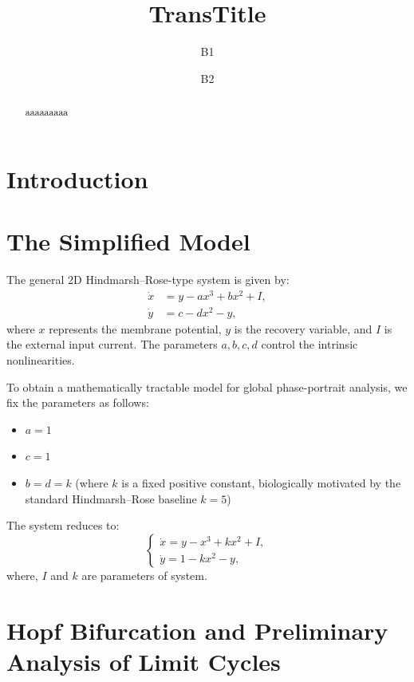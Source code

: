 \documentclass[11pt,reqno]{amsart}
\title[T]{TransTitle}
\author[A1]{B1}
\author[A2]{B2}
\theoremstyle{plain}
\theoremstyle{definition}
\theoremstyle{remark}
\begin{document}
\maketitle


\begin{abstract}
aaaaaaaaa
\end{abstract}

\section{Introduction}
\label{sec:intro}

\section{The Simplified Model}

The general 2D Hindmarsh--Rose-type system is given by:
\begin{equation}
\begin{aligned}
\dot{x} &= y - ax^3 + bx^2 + I, \\
\dot{y} &= c - dx^2 - y,
\end{aligned}
\end{equation}
where \(x\) represents the membrane potential, \(y\) is the recovery variable, and \(I\) is the external input current. The parameters \(a, b, c, d\) control the intrinsic nonlinearities.

To obtain a mathematically tractable model for global phase-portrait analysis, we fix the parameters as follows:
\begin{itemize}
    \item \(a = 1\)
    \item \(c = 1\)
    \item \(b = d = k\) (where \(k\) is a fixed positive constant, biologically motivated by the standard Hindmarsh--Rose baseline \(k=5\))
\end{itemize}

The system reduces to:
\begin{equation}
\label{eq:model}
\begin{cases}
\dot{x}=y-x^3+kx^2+I,\\[1mm]
\dot{y}=1-kx^2-y,
\end{cases}
\end{equation}
where, \(I\) and $k$ are parameters of system.

\section{Hopf Bifurcation and Preliminary Analysis of Limit Cycles}
\end{document}

